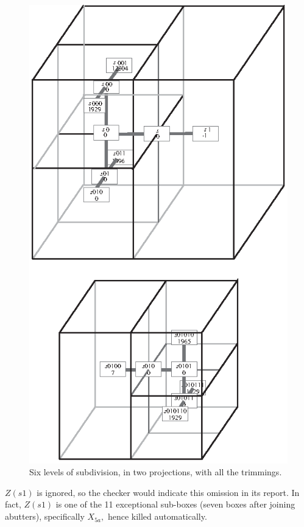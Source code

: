 \begin{example}
 
\begin{figure}[h]\label{GMT 5.1}
	\centering
	\includegraphics[scale=1.250]{fig5.1}

	\caption{
		Six levels of subdivision, in two projections,
		with all the trimmings.
	}
\end{figure}

$Z(s1)$ is ignored, so the checker would indicate this omission
in its report.  In fact, $Z(s1)$ is one of the 11 exceptional sub-boxes (seven boxes after joining abutters), specifically
$X_{5a},$ hence killed automatically.


\end{example}
